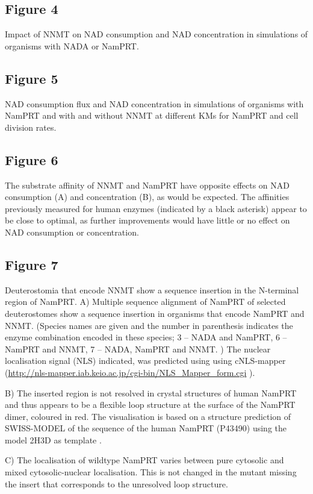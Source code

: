 \documentclass[paper=a4, 12pt]{scrartcl}
\begin{document}
\subsection{Figure 4}

Impact of NNMT on NAD consumption and NAD concentration in simulations of organisms with NADA or NamPRT.


\subsection{Figure 5}

NAD consumption flux and NAD concentration in simulations of organisms with NamPRT and with and without NNMT at different KMs for NamPRT and cell division rates.


\subsection{Figure 6}

The substrate affinity of NNMT and NamPRT have opposite effects on NAD consumption (A) and concentration (B), as would be expected. The affinities previously measured for human enzymes (indicated by a black asterisk) appear to be close to optimal, as further improvements would have little or no effect on NAD consumption or concentration.


\subsection{Figure 7}

Deuterostomia that encode NNMT show a sequence insertion in the N-terminal region of NamPRT. A) Multiple sequence alignment of NamPRT of selected deuterostomes show a sequence insertion in organisms that encode NamPRT and NNMT. (Species names are given and the number in parenthesis indicates the enzyme combination encoded in these species; 3 – NADA and NamPRT, 6 – NamPRT and NNMT, 7 – NADA, NamPRT and NNMT. ) The nuclear localisation signal (NLS) indicated, was predicted using using cNLS-mapper (\url{http://nls-mapper.iab.keio.ac.jp/cgi-bin/NLS_Mapper_form.cgi} \cite{Kosugi2009}).

B) The inserted region is not resolved in crystal structures of human NamPRT and thus appears to be a flexible loop structure at the surface of the NamPRT dimer, coloured in red. The visualisation is based on a structure prediction of SWISS-MODEL \cite{Arnold2006; Biasini2014} of the sequence of the human NamPRT (P43490) using the model 2H3D as template \cite{Wang2006}.

C) The localisation of wildtype NamPRT varies between pure cytosolic and mixed cytosolic-nuclear localisation. This is not changed in the mutant missing the insert that corresponds to the unresolved loop structure.
\end{document}
